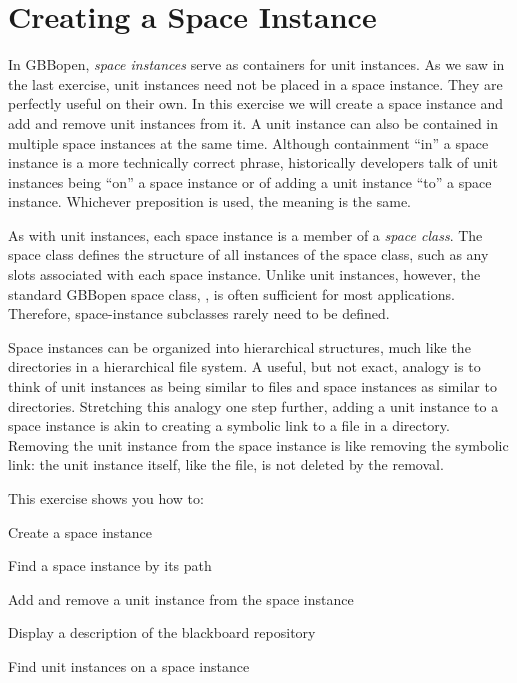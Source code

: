 \documentclass[10pt,twoside,english,pdftex]{article}
\begin{document}

\T\markright{}%
\T\pagestyle{plain}
\T\cleardoublepage
\W{}
\T\pagestyle{fancy}
\T\thispagestyle{fancybottom}
\T\renewcommand{\headrulewidth}{0pt}
\section{Creating a Space Instance}
\label{sec:space-instance}%

In GBBopen, \textit{space instances} serve as containers for unit instances.
As we saw in the last exercise, unit instances need not be placed in a space
instance.  They are perfectly useful on their own.  In this exercise we will
create a space instance and add and remove unit instances from it.  A unit
instance can also be contained in multiple space instances at the same time.
Although containment ``in'' a space instance is a more technically correct
phrase, historically developers talk of unit instances being ``on'' a space
instance or of adding a unit instance ``to'' a space instance.  Whichever
preposition is used, the meaning is the same.

As with unit instances, each space instance is a member of a \textit{space
  class}.  The space class defines the structure of all instances of the space
class, such as any slots associated with each space instance.  Unlike unit
instances, however, the standard GBBopen space class,
, is often sufficient for most
applications.  Therefore, space-instance subclasses rarely need to be defined.

Space instances can be organized into hierarchical structures, much like the
directories in a hierarchical file system.  A useful, but not exact, analogy
is to think of unit instances as being similar to files and space instances as
similar to directories.  Stretching this analogy one step further, adding a
unit instance to a space instance is akin to creating a symbolic link to a
file in a directory.  Removing the unit instance from the space instance is
like removing the symbolic link: the unit instance itself, like the file, is
not deleted by the removal.

\fndocrule

This exercise shows you how to:
\begin{tightitemize}
\item Create a space instance
\item Find a space instance by its path
\item Add and remove a unit instance from the space instance
\item Display a description of the blackboard repository
\item Find unit instances on a space instance
\end{tightitemize}
\end{document}
